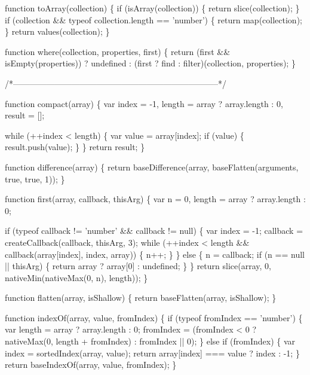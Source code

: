 \begin{DoxyCodeInclude}
{{  \textcolor{keyword}{function} toArray(collection) \{
    \textcolor{keywordflow}{if} (isArray(collection)) \{
      \textcolor{keywordflow}{return} slice(collection);
    \}
    \textcolor{keywordflow}{if} (collection && typeof collection.length == \textcolor{stringliteral}{'number'}) \{
      \textcolor{keywordflow}{return} map(collection);
    \}
    \textcolor{keywordflow}{return} values(collection);
  \}

  \textcolor{keyword}{function} where(collection, properties, first) \{
    \textcolor{keywordflow}{return} (first && isEmpty(properties))
      ? undefined
      : (first ? find : filter)(collection, properties);
  \}

  \textcolor{comment}{/*--------------------------------------------------------------------------*/}

  \textcolor{keyword}{function} compact(array) \{
    var index = -1,
        length = array ? array.length : 0,
        result = [];

    \textcolor{keywordflow}{while} (++index < length) \{
      var value = array[index];
      \textcolor{keywordflow}{if} (value) \{
        result.push(value);
      \}
    \}
    \textcolor{keywordflow}{return} result;
  \}

  \textcolor{keyword}{function} difference(array) \{
    \textcolor{keywordflow}{return} baseDifference(array, baseFlatten(arguments, \textcolor{keyword}{true}, \textcolor{keyword}{true}, 1));
  \}

  \textcolor{keyword}{function} first(array, callback, thisArg) \{
    var n = 0,
        length = array ? array.length : 0;

    \textcolor{keywordflow}{if} (typeof callback != \textcolor{stringliteral}{'number'} && callback != null) \{
      var index = -1;
      callback = createCallback(callback, thisArg, 3);
      \textcolor{keywordflow}{while} (++index < length && callback(array[index], index, array)) \{
        n++;
      \}
    \} \textcolor{keywordflow}{else} \{
      n = callback;
      \textcolor{keywordflow}{if} (n == null || thisArg) \{
        \textcolor{keywordflow}{return} array ? array[0] : undefined;
      \}
    \}
    \textcolor{keywordflow}{return} slice(array, 0, nativeMin(nativeMax(0, n), length));
  \}

  \textcolor{keyword}{function} flatten(array, isShallow) \{
    \textcolor{keywordflow}{return} baseFlatten(array, isShallow);
  \}

  \textcolor{keyword}{function} indexOf(array, value, fromIndex) \{
    \textcolor{keywordflow}{if} (typeof fromIndex == \textcolor{stringliteral}{'number'}) \{
      var length = array ? array.length : 0;
      fromIndex = (fromIndex < 0 ? nativeMax(0, length + fromIndex) : fromIndex || 0);
    \} \textcolor{keywordflow}{else} \textcolor{keywordflow}{if} (fromIndex) \{
      var index = sortedIndex(array, value);
      \textcolor{keywordflow}{return} array[index] === value ? index : -1;
    \}
    \textcolor{keywordflow}{return} baseIndexOf(array, value, fromIndex);
  \}

}}
\end{DoxyCodeInclude}
